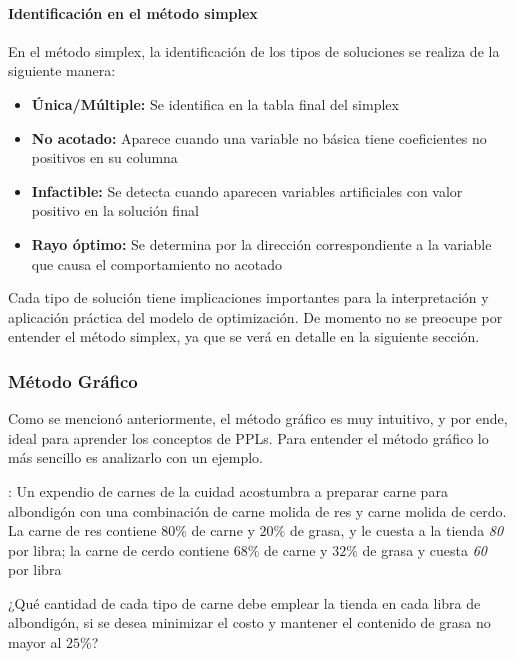 \paragraph{Identificación en el método simplex}

En el método simplex, la identificación de los tipos de soluciones se realiza de la siguiente manera:
\begin{itemize}
  \item \textbf{Única/Múltiple:} Se identifica en la tabla final del simplex
  \item \textbf{No acotado:} Aparece cuando una variable no básica tiene coeficientes no positivos en su columna
  \item \textbf{Infactible:} Se detecta cuando aparecen variables artificiales con valor positivo en la solución final
  \item \textbf{Rayo óptimo:} Se determina por la dirección correspondiente a la variable que causa el comportamiento no acotado
\end{itemize}

Cada tipo de solución tiene implicaciones importantes para la interpretación y aplicación práctica del modelo de optimización. De momento no se preocupe por entender el método simplex, ya que se verá en detalle en la siguiente sección.

\subsubsection{Método Gráfico}

Como se mencionó anteriormente, el método gráfico es muy intuitivo, y por ende, ideal para aprender los conceptos de PPLs. Para entender el método gráfico lo más sencillo es analizarlo con un ejemplo.

\ejemplo\label{ej:mtd_grfico}: Un expendio de carnes de la cuidad acostumbra a preparar carne para albondigón con una combinación de carne molida de res y carne molida de cerdo. La carne de res contiene \(80\%\) de carne y \(20\%\) de grasa, y le cuesta a la tienda \textcent \textit{80} por libra; la carne de cerdo contiene \(68\%\) de carne y \(32\%\) de grasa y cuesta \textcent \textit{60} por libra 

¿Qué cantidad de cada tipo de carne debe emplear la tienda en cada libra de albondigón, si se desea minimizar el costo y mantener el contenido de grasa no mayor al \(25\%\)?

